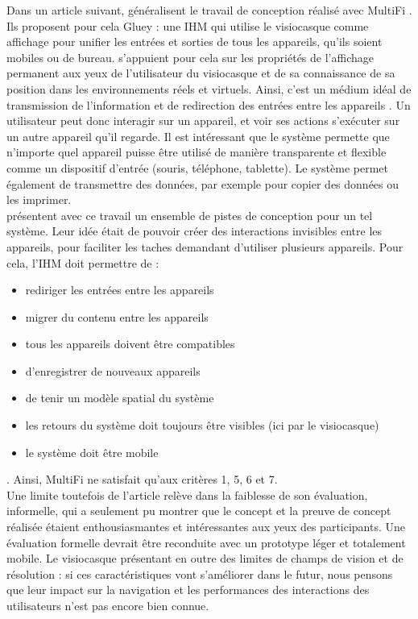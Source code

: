 
Dans un article suivant, \cite{Serrano2015} généralisent le travail de conception réalisé avec MultiFi \citep{Grubert2015}. Ils proposent pour cela Gluey : une IHM qui utilise le visiocasque comme affichage pour unifier les entrées et sorties de tous les appareils, qu'ils soient mobiles ou de bureau. \citeauthor{Serrano2015} s'appuient pour cela sur les propriétés de l'affichage permanent aux yeux de l'utilisateur du visiocasque et de sa connaissance de sa position dans les environnements réels et virtuels. Ainsi, c'est un médium idéal de transmission de l'information et de redirection des entrées entre les appareils .
Un utilisateur peut donc interagir sur un appareil, et voir ses actions s'exécuter sur un autre appareil qu'il regarde. Il est intéressant que le système permette que n'importe quel appareil puisse être utilisé de manière transparente et flexible comme un dispositif d'entrée (souris, téléphone, tablette). Le système permet également de transmettre des données, par exemple pour copier des données ou les imprimer.\\
\citeauthor{Serrano2015} présentent avec ce travail un ensemble de pistes de conception pour un tel système. Leur idée était de pouvoir créer des interactions invisibles entre les appareils, pour faciliter les taches demandant d'utiliser plusieurs appareils. Pour cela, l'IHM doit permettre de : 
\begin{itemize}
  \item rediriger les entrées entre les appareils
  \item migrer du contenu entre les appareils
  \item tous les appareils doivent être compatibles
  \item d'enregistrer de nouveaux appareils
  \item de tenir un modèle spatial du système
  \item les retours du système doit toujours être visibles (ici par le visiocasque)
  \item le système doit être mobile
\end{itemize}. Ainsi, MultiFi \citep{Grubert2015} ne satisfait qu'aux critères 1, 5, 6 et 7.\\
Une limite toutefois de l'article relève dans la faiblesse de son évaluation, informelle, qui a seulement pu montrer que le concept et la preuve de concept réalisée étaient enthousiasmantes et intéressantes aux yeux des participants. Une évaluation formelle devrait être reconduite avec un prototype léger et totalement mobile. Le visiocasque présentant en outre des limites de champs de vision et de résolution : si ces caractéristiques vont s'améliorer dans le futur, nous pensons que leur impact sur la navigation et les performances des interactions des utilisateurs n'est pas encore bien connue.

